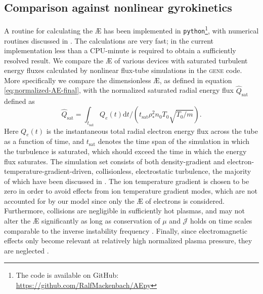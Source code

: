 \subsection{Comparison against nonlinear gyrokinetics}
A routine for calculating the \AE{} has been implemented in \texttt{python}\footnote{The code is available on GitHub: \url{https://github.com/RalfMackenbach/AEpy}}, with numerical routines discussed in \citep{mackenbach2023bounceaveraged}. The calculations are very fast; in the current implementation less than a CPU-minute is required to obtain a sufficiently resolved result.  We compare the \AE{} of various devices with saturated turbulent energy fluxes calculated by nonlinear flux-tube simulations in the \textsc{gene} code. More specifically we compare the dimensionless \AE{}, as defined in equation \eqref{eq:normalized-AE-final}, with the normalized saturated radial energy flux $\widehat{Q}_\text{sat}$ defined as
\begin{equation}
    \widehat{Q}_{\text{sat}} = \int_{t_\text{sat}} Q_e(t) \mathrm{d}t \Bigg/ \left(  t_\mathrm{sat} \rho_*^2 n_0 T_0  \sqrt{T_0/m} \right).
\end{equation}
Here $Q_e(t)$ is the instantaneous total radial electron energy flux across the tube as a function of time, and $t_\text{sat}$ denotes the time span of the simulation in which the turbulence is saturated, which should exceed the time in which the energy flux saturates. The simulation set consists of both density-gradient and electron-temperature-gradient-driven, collisionless, electrostatic turbulence, the majority of which have been discussed in \citet{Proll2022TurbulenceGradient}. The ion temperature gradient is chosen to be zero in order to avoid effects from ion temperature gradient modes, which are not accounted for by our model since only the \AE{} of electrons is considered. Furthermore, collisions are negligible in sufficiently hot plasmas, and may not alter the \AE{} significantly as long as conservation of $\mu$ and $\mathcal{J}$ holds on time scales comparable to the inverse instability frequency \citep{Kolmes2020RecoveringOperations}. Finally, since electromagnetic effects only become relevant at relatively high normalized plasma pressure, they are neglected \citep{Puschel2009ElectromagneticTurbulence,Aleynikova2018KineticStellarators}. \par 
